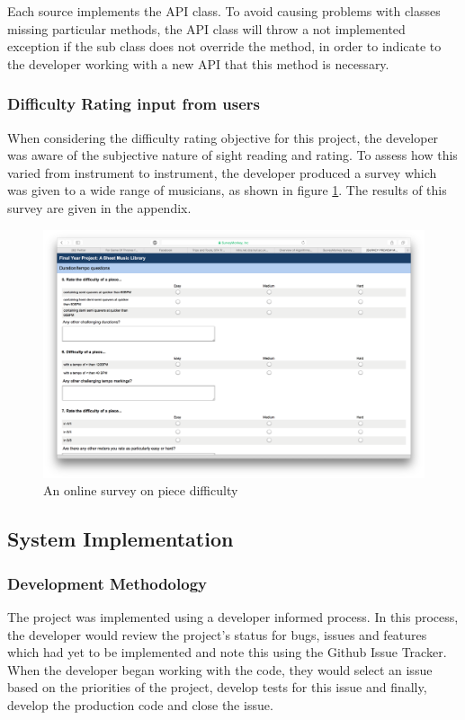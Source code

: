 Each source implements the API class. To avoid causing problems with classes missing particular methods, the API class will throw a not implemented exception if the sub class does not override the method, in order to indicate to the developer working with a new API that this method is necessary.

\subsubsection{Difficulty Rating input from users}
When considering the difficulty rating objective for this project, the developer was aware of the subjective nature of sight reading and rating. To assess how this varied from instrument to instrument, the developer produced a survey which was given to a wide range of musicians, as shown in figure \ref{fig:survey_difficulty}. The results of this survey are given in the appendix.

\begin{figure}[H]
\centering
\includegraphics[width=400pt]{survey_difficulty}
\caption{An online survey on piece difficulty}
\label{fig:survey_difficulty}	
\end{figure}



\subsection{System Implementation}
\subsubsection{Development Methodology}
The project was implemented using a developer informed process. In this process, the developer would review the project's status for bugs, issues and features which had yet to be implemented and note this using the Github Issue Tracker. When the developer began working with the code, they would select an issue based on the priorities of the project, develop tests for this issue and finally, develop the production code and close the issue.


